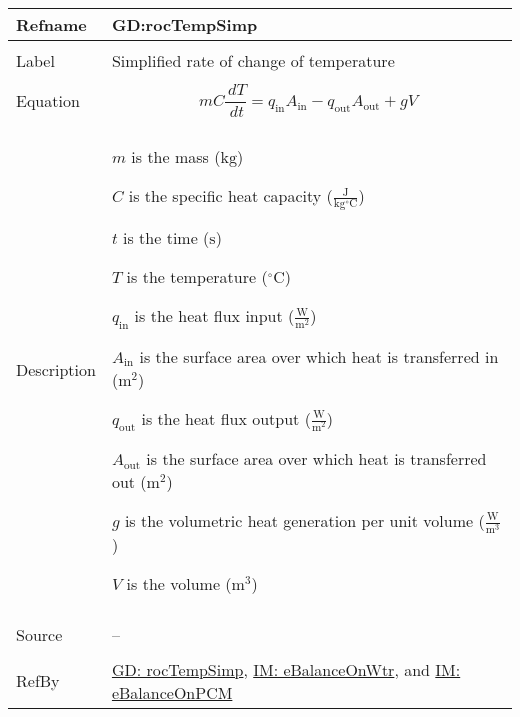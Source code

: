 \documentclass[12pt]{article}
\begin{document}
\vspace{\baselineskip}
\noindent
\begin{minipage}{\textwidth}
\begin{tabular}{>{\raggedright}p{}>{\raggedright\arraybackslash}p{}}
\toprule \textbf{Refname} & \textbf{GD:rocTempSimp}
\label{GD:rocTempSimp}
\\ \midrule \\
Label & Simplified rate of change of temperature
        
\\ \midrule \\
Equation & \begin{displaymath}
           m C \frac{\,dT}{\,dt}={q_{\text{in}}} {A_{\text{in}}}-{q_{\text{out}}} {A_{\text{out}}}+g V
           \end{displaymath}
\\ \midrule \\
Description & \begin{symbDescription}
              \item{$m$ is the mass (${\text{kg}}$)}
              \item{$C$ is the specific heat capacity ($\frac{\text{J}}{\text{kg}{}^{\circ}\text{C}}$)}
              \item{$t$ is the time (${\text{s}}$)}
              \item{$T$ is the temperature (${{}^{\circ}\text{C}}$)}
              \item{${q_{\text{in}}}$ is the heat flux input ($\frac{\text{W}}{\text{m}^{2}}$)}
              \item{${A_{\text{in}}}$ is the surface area over which heat is transferred in (${\text{m}^{2}}$)}
              \item{${q_{\text{out}}}$ is the heat flux output ($\frac{\text{W}}{\text{m}^{2}}$)}
              \item{${A_{\text{out}}}$ is the surface area over which heat is transferred out (${\text{m}^{2}}$)}
              \item{$g$ is the volumetric heat generation per unit volume ($\frac{\text{W}}{\text{m}^{3}}$)}
              \item{$V$ is the volume (${\text{m}^{3}}$)}
              \end{symbDescription}
\\ \midrule \\
Source & --
         
\\ \midrule \\
RefBy & \hyperref[GD:rocTempSimp]{GD: rocTempSimp}, \hyperref[IM:eBalanceOnWtr]{IM: eBalanceOnWtr}, and \hyperref[IM:eBalanceOnPCM]{IM: eBalanceOnPCM}
        
\\ \bottomrule
\end{tabular}
\end{minipage}
\end{document}
